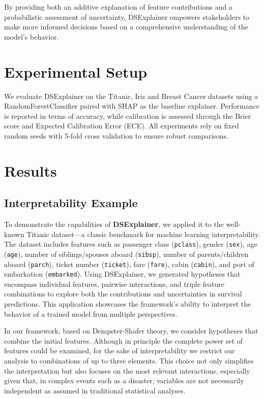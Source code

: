 \documentclass[acmlarge]{acmart}
\begin{document}
By providing both an additive explanation of feature contributions and a probabilistic assessment of uncertainty, DSExplainer empowers stakeholders to make more informed decisions based on a comprehensive understanding of the model’s behavior.
\section{Experimental Setup}
We evaluate DSExplainer on the Titanic, Iris and Breast Cancer datasets using a
RandomForestClassifier paired with SHAP as the baseline explainer. Performance
is reported in terms of accuracy, while calibration is assessed through the
Brier score and Expected Calibration Error (ECE). All experiments rely on fixed
random seeds with 5-fold cross validation to ensure robust comparisons.

\section{Results}
\label{sec:results}
\subsection{Interpretability Example}
\label{sec:interpretability_example}

To demonstrate the capabilities of \textbf{DSExplainer}, we applied it to the well-known Titanic dataset—a classic benchmark for machine learning interpretability. The dataset includes features such as passenger class (\texttt{pclass}), gender (\texttt{sex}), age (\texttt{age}), number of siblings/spouses aboard (\texttt{sibsp}), number of parents/children aboard (\texttt{parch}), ticket number (\texttt{ticket}), fare (\texttt{fare}), cabin (\texttt{cabin}), and port of embarkation (\texttt{embarked}). Using DSExplainer, we generated hypotheses that encompass individual features, pairwise interactions, and triple feature combinations to explore both the contributions and uncertainties in survival predictions. This application showcases the framework's ability to interpret the behavior of a trained model from multiple perspectives.

In our framework, based on Dempster-Shafer theory, we consider hypotheses that combine the initial features. Although in principle the complete power set of features could be examined, for the sake of interpretability we restrict our analysis to combinations of up to three elements. This choice not only simplifies the interpretation but also focuses on the most relevant interactions, especially given that, in complex events such as a disaster, variables are not necessarily independent as assumed in traditional statistical analyses.
\end{document}
